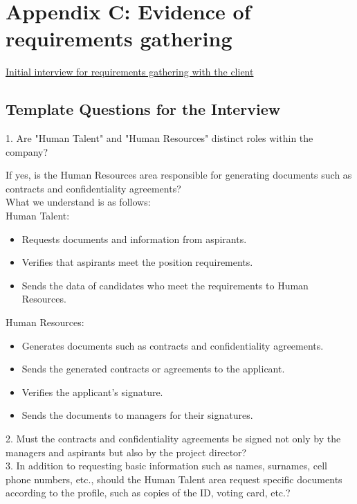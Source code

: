 \documentclass{scrreprt}
\begin{document}
\FloatBarrier 

\section{Appendix C: Evidence of requirements gathering}
\href{https://drive.google.com/file/d/1h30RbdVEBx5Qlg8GVXav69ps1Y7cQVRv/view?usp=drive_link}{Initial interview for requirements gathering with the client}
\subsection*{Template Questions for the Interview}

1. Are "Human Talent" and "Human Resources" distinct roles within the company?

    If yes, is the Human Resources area responsible for generating documents such as contracts and confidentiality agreements?\\

    What we understand is as follows:\\
    Human Talent:
    \begin{itemize}
        \item Requests documents and information from aspirants.
        \item Verifies that aspirants meet the position requirements.
        \item Sends the data of candidates who meet the requirements to Human Resources.
    \end{itemize}
    Human Resources:
    \begin{itemize}
        \item Generates documents such as contracts and confidentiality agreements.
        \item Sends the generated contracts or agreements to the applicant.
        \item Verifies the applicant's signature.
        \item Sends the documents to managers for their signatures.
    \end{itemize}

2. Must the contracts and confidentiality agreements be signed not only by the managers and aspirants but also by the project director?\\

3. In addition to requesting basic information such as names, surnames, cell phone numbers, etc., should the Human Talent area request specific documents according to the profile, such as copies of the ID, voting card, etc.?\\
\end{document}

